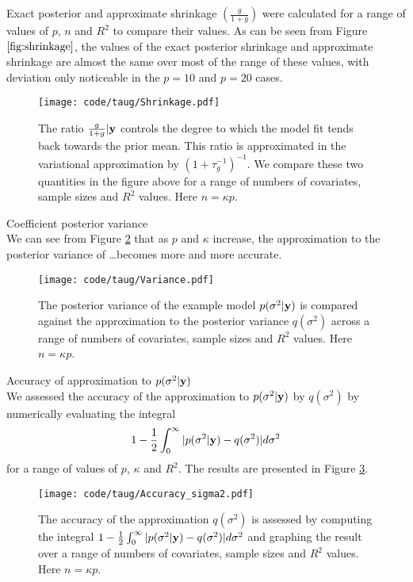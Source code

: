 \documentclass{amsart}[12pt]
\begin{document}
Exact posterior and approximate shrinkage $\left( \frac{g}{1 + g} \right)$ were calculated for a range of
values of $p$, $n$ and $R^2$ to compare their values. As can be seen from Figure $\ref{fig:shrinkage}$, the
values of the exact posterior shrinkage and approximate shrinkage are almost the same over most of the range
of these values, with deviation only noticeable in the $p=10$ and $p=20$ cases.

\begin{figure}[p]
	\texttt{[image: code/taug/Shrinkage.pdf]}
	\caption{The ratio $\frac{g}{1 + g} | {\bf y}$ controls the degree to which the model fit tends back towards
		the prior mean. This ratio is approximated in the variational approximation by $(1 + \tau_g^{-1})^{-1}$. We
		compare these two quantities in the figure above for a range of numbers of covariates, sample sizes and $R^2$
		values. Here $n = \kappa p$.}
	\label{fig:shrinkage}
\end{figure}

Coefficient posterior variance \\

We can see from Figure \ref{fig:variance} that as $p$ and $\kappa$ increase, the approximation to the
posterior variance of \ldots becomes more and more accurate.

\begin{figure}[p]
	\texttt{[image: code/taug/Variance.pdf]}
	\caption{The posterior variance of the example model $p(\sigma^2 | {\bf y})$ is compared against the approximation
		to the posterior variance $q(\sigma^2)$ across a range of numbers of covariates, sample sizes and $R^2$
		values. Here $n = \kappa p$.}
	\label{fig:variance}
\end{figure}

Accuracy of approximation to $p(\sigma^2 | {\bf y})$ \\

We assessed the accuracy of the approximation to $p(\sigma^2 | {\bf y})$ by $q(\sigma^2)$ by numerically evaluating
the integral
\[
	1 - \frac{1}{2} \int_0^\infty |p(\sigma^2 | {\bf y}) - q(\sigma^2)| d \sigma^2
\]
for a range of values of $p$, $\kappa$ and $R^2$. The results are presented in Figure \ref{fig:accuracy_sigma2}.

\begin{figure}[p]
	\texttt{[image: code/taug/Accuracy\_sigma2.pdf]}
	\caption{The accuracy of the approximation $q(\sigma^2)$ is assessed by computing the integral   $1 -
		\frac{1}{2} \int_0^\infty |p(\sigma^2 | {\bf y}) - q(\sigma^2)| d \sigma^2$ and graphing the result over a range
		of numbers of covariates, sample sizes and $R^2$  values. Here $n = \kappa p$.}
	\label{fig:accuracy_sigma2}
\end{figure}
\end{document}
